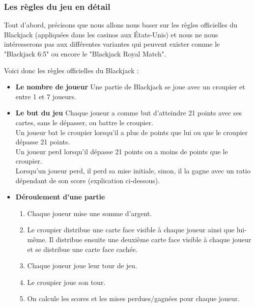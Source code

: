 \documentclass{article}
\begin{document}
\subsubsection{Les règles du jeu en détail}

Tout d'abord, précisons que nous allons nous baser sur les règles officielles du Blackjack (appliquées dans les casinos aux États-Unis) et nous ne nous intéresserons pas aux différentes variantes qui peuvent exister comme le "Blackjack 6:5" ou encore le "Blackjack Royal Match".

\bigskip

Voici donc les règles officielles du Blackjack :

\begin{itemize}
    \item \textbf{Le nombre de joueur} \newline
    Une partie de Blackjack se joue avec un croupier et entre 1 et 7 joueurs.

    \item \textbf{Le but du jeu} \newline
    Chaque joueur a comme but d'atteindre 21 points avec ses cartes, sans le dépasser, ou battre le croupier.\\
    Un joueur bat le croupier lorsqu'il a plus de points que lui ou que le croupier dépasse 21 points.\\
    Un joueur perd lorsqu'il dépasse 21 points ou a moins de points que le croupier.\\
    Lorsqu'un joueur perd, il perd sa mise initiale, sinon, il la gagne avec un ratio dépendant de son score (explication ci-dessous).

    \item \textbf{Déroulement d'une partie}
    \begin{enumerate}
        \item Chaque joueur mise une somme d'argent.
        \item Le croupier distribue une carte face visible à chaque joueur ainsi que lui-même. Il distribue ensuite une deuxième carte face visible à chaque joueur et se distribue une carte face cachée.
        \item Chaque joueur joue leur tour de jeu.
        \item Le croupier joue son tour.
        \item On calcule les scores et les mises perdues/gagnées pour chaque joueur.
    \end{enumerate}
    

\end{itemize}
\end{document}
